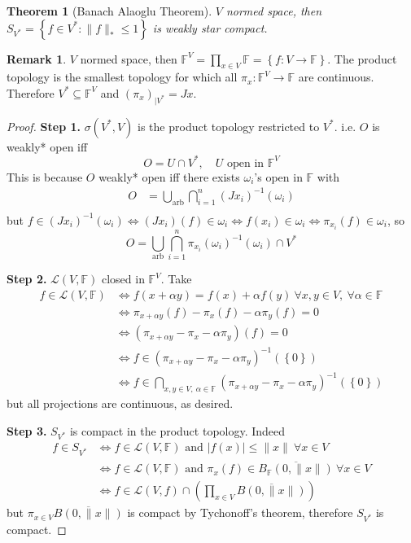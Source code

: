 \documentclass[11pt,a4paper]{article}
\theoremstyle{definition}
\newtheorem{remark}[definition]{Remark}
\theoremstyle{plain}
\newtheorem{theorem}[definition]{Theorem}
\theoremstyle{remark}
\newcommand{\F}{\mathbb{F}}
\renewcommand{\set}[1]{\left\{ #1 \right\}}
\newcommand{\abs}[1]{\lvert #1 \rvert}
\newcommand{\norm}[1]{\lVert #1 \rVert}
\newcommand{\1}{\mathbbm{1}}
\begin{document}
\begin{theorem}[Banach Alaoglu Theorem]
    $V$ normed space, then $S_{V^*} = \set{f \in V^* \colon \norm{f}_* \le 1}$ is weakly star compact.
\end{theorem}

\begin{remark}
    $V$ normed space, then $\F^V = \prod_{x \in V} \F = \set{f \colon V \to \F}$. The product topology is the smallest topology for which all $\pi_x \colon \F^V \to \F$ are continuous. 
    Therefore $V^* \subseteq \F^V$ and $(\pi_{x})_{|V^*} = Jx$. 
\end{remark}

\begin{proof}
    \textbf{Step 1.} $\sigma(V^*, V)$ is the product topology restricted to $V^*$. i.e. $O$ is weakly* open iff 
    $$O = U \cap V^*, \quad \text{$U$ open in $\F^V$}$$
    This is because $O$ weakly* open iff there exists $\omega_i$'s open in $\F$ with  
    \begin{align*}
        O &= \bigcup_{\text{arb}} \bigcap_{i=1}^n (J {x_i})^{-1} (\omega_i) \\ 
    \end{align*}
    but $f \in (Jx_i)^{-1} (\omega_i) \iff (Jx_i) (f) \in \omega_i \iff f(x_i) \in \omega_i \iff \pi_{x_i} (f) \in \omega_i$, so 
    $$O = \bigcup_{\text{arb}} \bigcap_{i=1}^n \pi_{x_i}(\omega_i)^{-1} (\omega_i) \cap V^*$$

    \textbf{Step 2.} $\mathcal{L}(V, \F)$ closed in $\F^V$. Take 
    \begin{align*}
        f \in \mathcal{L}(V, \F) &\iff f(x+ \alpha y) = f(x) + \alpha f(y) \ \forall x, y \in V, \ \forall \alpha \in \F \\
        &\iff \pi_{x + \alpha y} (f) - \pi_x(f) - \alpha \pi_y(f) = 0 \\
        &\iff (\pi_{x + \alpha y} - \pi_x - \alpha \pi_y) (f) = 0 \\
        &\iff f \in (\pi_{x + \alpha y} - \pi_x - \alpha \pi_y)^{-1} (\set{0}) \\
        &\iff f \in \bigcap_{x, y \in V, \ \alpha \in \F} (\pi_{x + \alpha y} - \pi_x - \alpha \pi_y)^{-1} (\set{0})
    \end{align*} 
    but all projections are continuous, as desired. 

    \textbf{Step 3.} $S_{V^*}$ is compact in the product topology. Indeed
    \begin{align*}
        f \in S_{V^*} &\iff f \in \mathcal{L}(V, \F) \text{ and } \abs{f(x)} \le \norm{x} \ \forall x \in V \\
        &\iff f \in \mathcal{L}(V, \F) \text{ and } \pi_x(f) \in \overline{B_\F(0, \norm{x})} \ \forall x \in V \\
        &\iff f \in \mathcal{L}(V, f) \cap  \left(\prod_{x \in V} \overline{B(0, \norm{x})}\right)
    \end{align*}
    but $\pi_{x \in V} \overline{B(0, \norm{x})}$ is compact by Tychonoff's theorem, therefore $S_{V^*}$ is compact. 
\end{proof}
\end{document}
